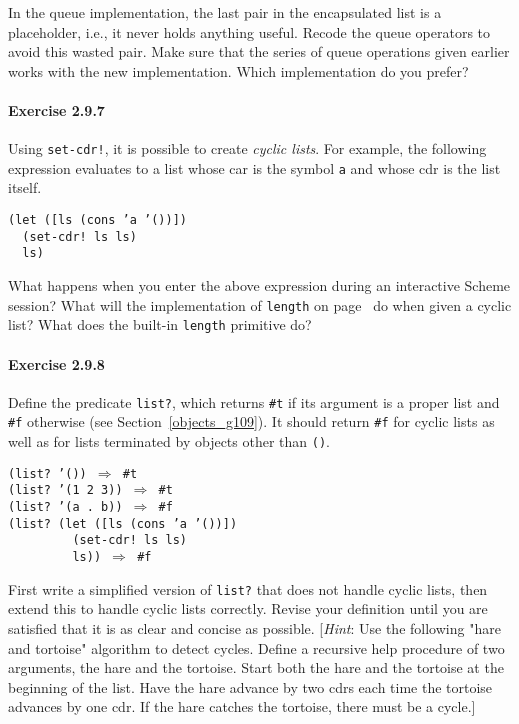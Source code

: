 \label{start_s195}In the queue implementation, the last pair in the encapsulated
list is a placeholder, i.e., it never holds anything useful.
Recode the queue operators to avoid this wasted pair.
Make sure that the series of queue operations given earlier
works with the new implementation.
Which implementation do you prefer?




\paragraph{Exercise \label{start_g47}2.9.7}


\label{start_s196}Using \label{start_s197}\texttt{set-cdr!}, it is possible to create \label{start_s198}\textit{cyclic lists}.
For example, the following expression evaluates to a list whose
car is the symbol \texttt{a} and whose cdr is the list itself.


\begin{alltt}
(let ([ls (cons 'a '())])
  (set-cdr! ls ls)
  ls)
\end{alltt}


What happens when you enter the above expression during an interactive
Scheme session?
What will the implementation of \texttt{length} on page \pageref{start_defn_simplelength}
do when given a cyclic list?
What does the built-in \texttt{length} primitive do?




\paragraph{Exercise \label{start_g48}2.9.8}


\label{start_s199}\label{start_EXLIST_}Define the predicate \label{start_s200}\texttt{list?}, which returns
\texttt{\#{}t} if its argument is a \label{start_s201}proper list and \texttt{\#{}f} otherwise
(see Section \ref{objects_g109}).
It should return \texttt{\#{}f} for cyclic lists as well as for lists
terminated by objects other than \texttt{()}.


\begin{alltt}
(list? '()) \(\Rightarrow\) \#{}t
(list? '(1 2 3)) \(\Rightarrow\) \#{}t
(list? '(a . b)) \(\Rightarrow\) \#{}f
(list? (let ([ls (cons 'a '())])
         (set-cdr! ls ls)
         ls)) \(\Rightarrow\) \#{}f
\end{alltt}


First write a simplified version of \texttt{list?} that does not handle
cyclic lists, then extend this to handle cyclic lists correctly.
Revise your definition until you are satisfied that it is as clear
and concise as possible.
[\textit{Hint}: Use the following "\label{start_s202}hare and tortoise" algorithm to
detect cycles.
Define a recursive help procedure of two arguments, the hare and the tortoise.
Start both the hare and the tortoise at the beginning of the list.
Have the hare advance by two cdrs each time the tortoise
advances by one cdr.
If the hare catches the tortoise, there must be a cycle.]





